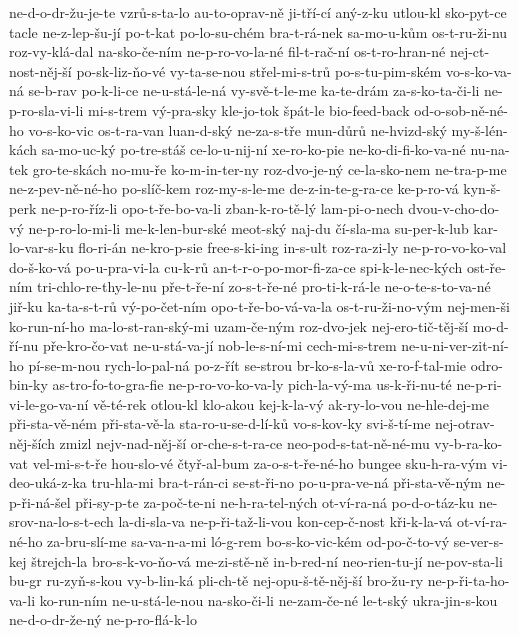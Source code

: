 ne-d-o-dr-žu-je-te
vzrů-s-ta-lo
au-to-oprav-ně
ji-tří-cí
aný-z-ku
utlou-kl
sko-pyt-ce
tacle
ne-z-lep-šu-jí
po-t-kat
po-lo-su-chém
bra-t-rá-nek
sa-mo-u-kům
os-t-ru-ži-nu
roz-vy-klá-dal
na-sko-če-ním
ne-p-ro-vo-la-né
fil-t-rač-ní
os-t-ro-hran-né
nej-ct-nost-něj-ší
po-sk-liz-ňo-vé
vy-ta-se-nou
střel-mi-s-trů
po-s-tu-pim-ském
vo-s-ko-va-ná
se-b-rav
po-k-li-ce
ne-u-stá-le-ná
vy-svě-t-le-me
ka-te-drám
za-s-ko-ta-či-li
ne-p-ro-sla-vi-li
mi-s-trem
vý-pra-sky
kle-jo-tok
špát-le
bio-feed-back
od-o-sob-ně-né-ho
vo-s-ko-vic
os-t-ra-van
luan-d-ský
ne-za-s-tře
mun-důrů
ne-hvizd-ský
my-š-lén-kách
sa-mo-uc-ký
po-tre-stáš
ce-lo-u-nij-ní
xe-ro-ko-pie
ne-ko-di-fi-ko-va-né
nu-na-tek
gro-te-skách
no-mu-ře
ko-m-in-ter-ny
roz-dvo-je-ný
ce-la-sko-nem
ne-tra-p-me
ne-z-pev-ně-né-ho
po-slíč-kem
roz-my-s-le-me
de-z-in-te-g-ra-ce
ke-p-ro-vá
kyn-š-perk
ne-p-ro-říz-li
opo-t-ře-bo-va-li
zban-k-ro-tě-lý
lam-pi-o-nech
dvou-v-cho-do-vý
ne-p-ro-lo-mi-li
me-k-len-bur-ské
meot-ský
naj-du
čí-sla-ma
su-per-k-lub
kar-lo-var-s-ku
flo-ri-án
ne-kro-p-sie
free-s-ki-ing
in-s-ult
roz-ra-zi-ly
ne-p-ro-vo-ko-val
do-š-ko-vá
po-u-pra-vi-la
cu-k-rů
an-t-r-o-po-mor-fi-za-ce
spi-k-le-nec-kých
ost-ře-ním
tri-chlo-re-thy-le-nu
pře-t-ře-ní
zo-s-t-ře-né
pro-ti-k-rá-le
ne-o-te-s-to-va-né
jiř-ku
ka-ta-s-t-rů
vý-po-čet-ním
opo-t-ře-bo-vá-va-la
os-t-ru-ži-no-vým
nej-men-ši
ko-run-ní-ho
ma-lo-st-ran-ský-mi
uzam-če-ným
roz-dvo-jek
nej-ero-tič-těj-ší
mo-d-ří-nu
pře-kro-čo-vat
ne-u-stá-va-jí
nob-le-s-ní-mi
cech-mi-s-trem
ne-u-ni-ver-zit-ní-ho
pí-se-m-nou
rych-lo-pal-ná
po-z-řít
se-strou
br-ko-s-la-vů
xe-ro-f-tal-mie
odro-bin-ky
as-tro-fo-to-gra-fie
ne-p-ro-vo-ko-va-ly
pich-la-vý-ma
us-k-ři-nu-té
ne-p-ri-vi-le-go-va-ní
vě-té-rek
otlou-kl
klo-akou
kej-k-la-vý
ak-ry-lo-vou
ne-hle-dej-me
při-sta-vě-ném
při-sta-vě-la
sta-ro-u-se-d-lí-ků
vo-s-kov-ky
svi-š-tí-me
nej-otrav-něj-ších
zmizl
nejv-nad-něj-ší
or-che-s-t-ra-ce
neo-pod-s-tat-ně-né-mu
vy-b-ra-ko-vat
vel-mi-s-t-ře
hou-slo-vé
čtyř-al-bum
za-o-s-t-ře-né-ho
bungee
sku-h-ra-vým
vi-deo-uká-z-ka
tru-hla-mi
bra-t-rán-ci
se-st-ři-no
po-u-pra-ve-ná
při-sta-vě-ným
ne-p-ři-ná-šel
při-sy-p-te
za-poč-te-ni
ne-h-ra-tel-ných
ot-ví-ra-ná
po-d-o-táz-ku
ne-srov-na-lo-s-t-ech
la-di-sla-va
ne-p-ři-taž-li-vou
kon-cep-č-nost
kři-k-la-vá
ot-ví-ra-né-ho
za-bru-slí-me
sa-va-n-a-mi
ló-g-rem
bo-s-ko-vic-kém
od-po-č-to-vý
se-ver-s-kej
štrejch-la
bro-s-k-vo-ňo-vá
me-zi-stě-ně
in-b-red-ní
neo-rien-tu-jí
ne-pov-sta-li
bu-gr
ru-zyň-s-kou
vy-b-lin-ká
pli-ch-tě
nej-opu-š-tě-něj-ší
bro-žu-ry
ne-p-ři-ta-ho-va-li
ko-run-ním
ne-u-stá-le-nou
na-sko-či-li
ne-zam-če-né
le-t-ský
ukra-jin-s-kou
ne-d-o-dr-že-ný
ne-p-ro-flá-k-lo

